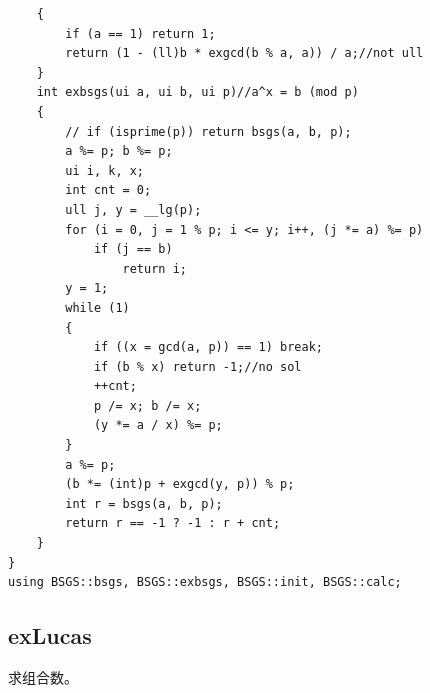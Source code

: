 \documentclass[12pt]{ctexart}
\begin{document}
\begin{lstlisting}
    {
        if (a == 1) return 1;
        return (1 - (ll)b * exgcd(b % a, a)) / a;//not ull
    }
    int exbsgs(ui a, ui b, ui p)//a^x = b (mod p)
    {
        // if (isprime(p)) return bsgs(a, b, p);
        a %= p; b %= p;
        ui i, k, x;
        int cnt = 0;
        ull j, y = __lg(p);
        for (i = 0, j = 1 % p; i <= y; i++, (j *= a) %= p)
            if (j == b)
                return i;
        y = 1;
        while (1)
        {
            if ((x = gcd(a, p)) == 1) break;
            if (b % x) return -1;//no sol
            ++cnt;
            p /= x; b /= x;
            (y *= a / x) %= p;
        }
        a %= p;
        (b *= (int)p + exgcd(y, p)) % p;
        int r = bsgs(a, b, p);
        return r == -1 ? -1 : r + cnt;
    }
}
using BSGS::bsgs, BSGS::exbsgs, BSGS::init, BSGS::calc;
\end{lstlisting}

\subsection{exLucas}

求组合数。
\end{document}
